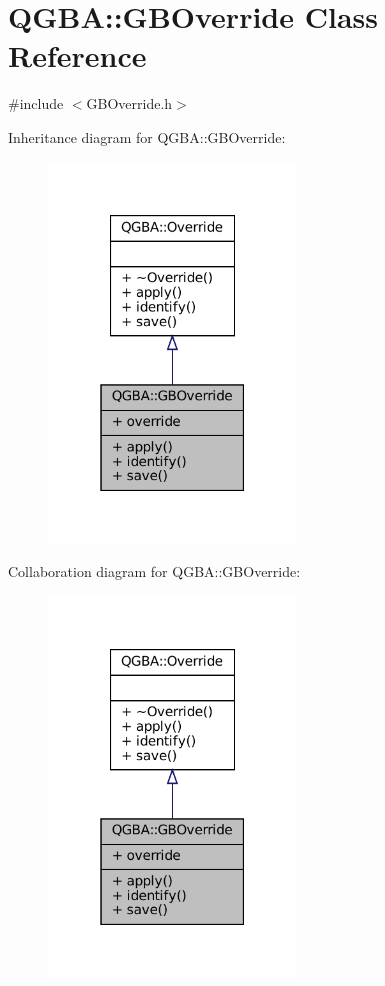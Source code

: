 \hypertarget{class_q_g_b_a_1_1_g_b_override}{}\section{Q\+G\+BA\+:\+:G\+B\+Override Class Reference}
\label{class_q_g_b_a_1_1_g_b_override}


{\ttfamily \#include $<$G\+B\+Override.\+h$>$}



Inheritance diagram for Q\+G\+BA\+:\+:G\+B\+Override\+:
\nopagebreak
\begin{figure}[H]
\begin{center}
\leavevmode
\includegraphics[width=187pt]{class_q_g_b_a_1_1_g_b_override__inherit__graph}
\end{center}
\end{figure}


Collaboration diagram for Q\+G\+BA\+:\+:G\+B\+Override\+:
\nopagebreak
\begin{figure}[H]
\begin{center}
\leavevmode
\includegraphics[width=187pt]{class_q_g_b_a_1_1_g_b_override__coll__graph}
\end{center}
\end{figure}
